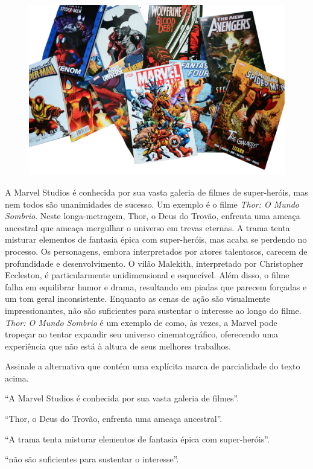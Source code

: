 \begin{myquote}

\begin{figure}[H]
\centering
\includegraphics[scale=0.25]{./imgSAEB_7_POR/media/image48.png}
\end{figure}

A Marvel Studios é conhecida por sua vasta galeria de filmes de super-heróis,
mas nem todos são unanimidades de sucesso. Um exemplo é o filme \textit{Thor: O Mundo
Sombrio}. Neste longa-metragem, Thor, o Deus do Trovão, enfrenta uma ameaça
ancestral que ameaça mergulhar o universo em trevas eternas. A trama tenta
misturar elementos de fantasia épica com super-heróis, mas acaba se perdendo
no processo. Os personagens, embora interpretados por atores talentosos,
carecem de profundidade e desenvolvimento. O vilão Malekith, interpretado por
Christopher Eccleston, é particularmente unidimensional e esquecível. Além
disso, o filme falha em equilibrar humor e drama, resultando em piadas que
parecem forçadas e um tom geral inconsistente. Enquanto as cenas de ação são
visualmente impressionantes, não são suficientes para sustentar o interesse ao
longo do filme. \textit{Thor: O Mundo Sombrio} é um exemplo de como, às vezes, a
Marvel pode tropeçar ao tentar expandir seu universo cinematográfico,
oferecendo uma experiência que não está à altura de seus melhores trabalhos.

\end{myquote}

Assinale a alternativa que contém uma explícita marca de parcialidade do texto acima.

\begin{escolha}
  
  \item ``A Marvel Studios é conhecida por sua vasta galeria de filmes''.
  
  \item ``Thor, o Deus do Trovão, enfrenta uma ameaça ancestral''.
  
  \item ``A trama tenta misturar elementos de fantasia épica com super-heróis''.
  
  \item ``não são suficientes para sustentar o interesse''.

\end{escolha}

